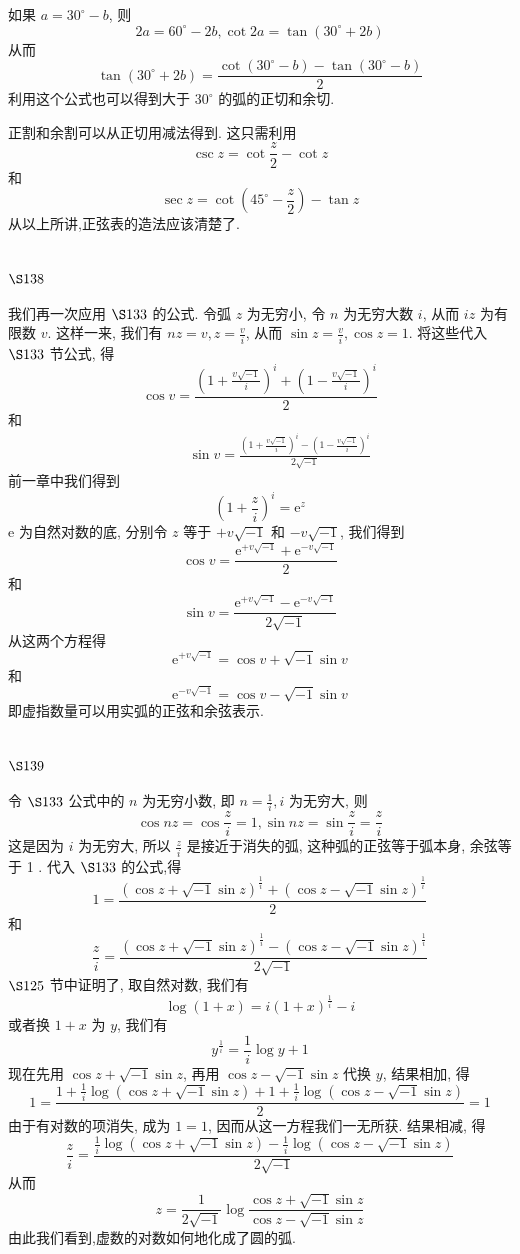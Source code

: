 如果 $a=30^{\circ}-b$, 则
\[
2 a=60^{\circ}-2 b, \cot 2 a=\tan \left(30^{\circ}+2 b\right)
\]
从而
\[
\tan \left(30^{\circ}+2 b\right)=\frac{\cot \left(30^{\circ}-b\right)-\tan \left(30^{\circ}-b\right)}{2}
\]
利用这个公式也可以得到大于 $30^{\circ}$ 的弧的正切和余切.

正割和余割可以从正切用减法得到. 这只需利用
\[
\csc z=\cot \frac{z}{2}-\cot z
\]
和
\[
\sec z=\cot \left(45^{\circ}-\frac{z}{2}\right)-\tan z
\]
从以上所讲,正弦表的造法应该清楚了.

\section{$\S 138$}

我们再一次应用 $\S 133$ 的公式. 令弧 $z$ 为无穷小, 令 $n$ 为无穷大数 $i$, 从而 $i z$ 为有限数 $v$. 这样一来, 我们有 $n z=v, z=\frac{v}{i}$, 从而 $\sin z=\frac{v}{i}, \cos z=1$. 将这些代入 $\S 133$ 节公式, 得
\[
\cos v=\frac{\left(1+\frac{v \sqrt{-1}}{i}\right)^{i}+\left(1-\frac{v \sqrt{-1}}{i}\right)^{i}}{2}
\]
和 
\[
\begin{aligned}
& \qquad \sin v=\frac{\left(1+\frac{v \sqrt{-1}}{i}\right)^{i}-\left(1-\frac{v \sqrt{-1}}{i}\right)^{i}}{2 \sqrt{-1}}
\end{aligned}
\]
前一章中我们得到
\[
\left(1+\frac{z}{i}\right)^{i}=\mathrm{e}^{z}
\]
$\mathrm{e}$ 为自然对数的底, 分别令 $z$ 等于 $+v \sqrt{-1}$ 和 $-v \sqrt{-1}$, 我们得到
\[
\cos v=\frac{\mathrm{e}^{+v \sqrt{-1}}+\mathrm{e}^{-v \sqrt{-1}}}{2}
\]
和
\[
\sin v=\frac{\mathrm{e}^{+v \sqrt{-1}}-\mathrm{e}^{-v \sqrt{-1}}}{2 \sqrt{-1}}
\]
从这两个方程得
\[
\mathrm{e}^{+v \sqrt{-1}}=\cos v+\sqrt{-1} \sin v
\]
和
\[
\mathrm{e}^{-v \sqrt{-1}}=\cos v-\sqrt{-1} \sin v
\]
即虚指数量可以用实弧的正弦和余弦表示.

\section{$\S 139$}

令 $\S 133$ 公式中的 $n$ 为无穷小数, 即 $n=\frac{1}{i}, i$ 为无穷大, 则
\[
\cos n z=\cos \frac{z}{i}=1, \sin n z=\sin \frac{z}{i}=\frac{z}{i}
\]
这是因为 $i$ 为无穷大, 所以 $\frac{z}{i}$ 是接近于消失的弧, 这种弧的正弦等于弧本身, 余弦等于 1 . 代入 $\S 133$ 的公式,得
\[
1=\frac{(\cos z+\sqrt{-1} \sin z)^{\frac{1}{i}}+(\cos z-\sqrt{-1} \sin z)^{\frac{1}{i}}}{2}
\]
和
\[
\frac{z}{i}=\frac{(\cos z+\sqrt{-1} \sin z)^{\frac{1}{i}}-(\cos z-\sqrt{-1} \sin z)^{\frac{1}{i}}}{2 \sqrt{-1}}
\]
$\S 125$ 节中证明了, 取自然对数, 我们有
\[
\log (1+x)=i(1+x)^{\frac{1}{i}}-i
\]
或者换 $1+x$ 为 $y$, 我们有
\[
y^{\frac{1}{i}}=\frac{1}{i} \log y+1
\]
现在先用 $\cos z+\sqrt{-1} \sin z$, 再用 $\cos z-\sqrt{-1} \sin z$ 代换 $y$, 结果相加, 得 
\[
 1=\frac{1+\frac{1}{i} \log (\cos z+\sqrt{-1} \sin z)+1+\frac{1}{i} \log (\cos z-\sqrt{-1} \sin z)}{2}=1
\]
由于有对数的项消失, 成为 $1=1$, 因而从这一方程我们一无所获. 结果相减, 得
\[
\frac{z}{i}=\frac{\frac{1}{i} \log (\cos z+\sqrt{-1} \sin z)-\frac{1}{i} \log (\cos z-\sqrt{-1} \sin z)}{2 \sqrt{-1}}
\]
从而
\[
z=\frac{1}{2 \sqrt{-1}} \log \frac{\cos z+\sqrt{-1} \sin z}{\cos z-\sqrt{-1} \sin z}
\]
由此我们看到,虚数的对数如何地化成了圆的弧.

